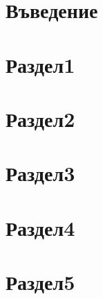\documentclass[11pt,a4paper,twoside]{article}
\begin{document}
\tableofcontents
\thispagestyle{contents}
\newpage

\section{Въведение}\label{Abstr}
%

\section{Раздел1}\label{Sect1}
%

\section{Раздел2}\label{Sect2}
%

\section{Раздел3}\label{Sect3}
%

\section{Раздел4}\label{Sect4}
%

\section{Раздел5}\label{Sect5}
%

%

%
\end{document}
